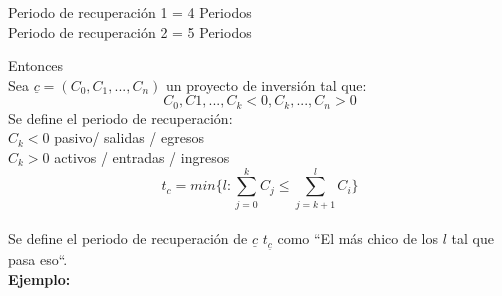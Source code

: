 \begin{center}
    Periodo de recuperación 1 = 4 Periodos\\
    Periodo de recuperación 2 = 5 Periodos
\end{center}
Entonces\\
Sea $\underline{c} = (C_0,C_1,...,C_n)$ un proyecto de inversión tal que:
$$C_0,C1,...,C_k <0 ,C_k,...,C_n >0$$
Se define el periodo de recuperación:\\
    $C_k<0$ pasivo/ salidas / egresos \\
    $C_k>0$ activos / entradas / ingresos\\
 $$t_c = min\big\{l:\sum_{j=0}^{k}C_j\leq \sum_{j=k+1}^l C_i\big\}$$ \\
 Se define el periodo de recuperación de  $\underline{c}$ $t_{\underline{c}}$ como ``El más chico de los $l$ tal que pasa eso``.\\
 \textbf{Ejemplo:}

